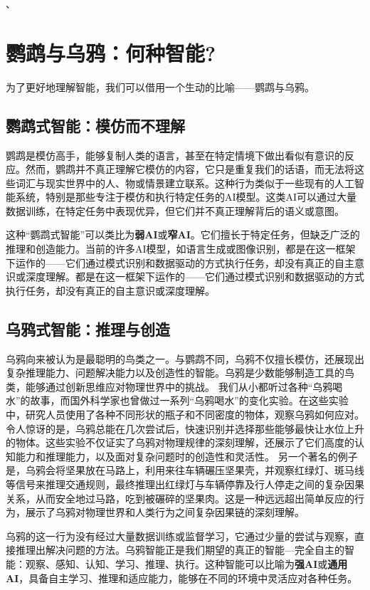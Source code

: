 、\section{鹦鹉与乌鸦：何种智能?}

为了更好地理解智能，我们可以借用一个生动的比喻——鹦鹉与乌鸦。

\subsection*{鹦鹉式智能：模仿而不理解}
鹦鹉是模仿高手，能够复制人类的语言，甚至在特定情境下做出看似有意识的反应。然而，鹦鹉并不真正理解它模仿的内容，它只是重复我们的话语，而无法将这些词汇与现实世界中的人、物或情景建立联系。这种行为类似于一些现有的人工智能系统，特别是那些专注于模仿和执行特定任务的AI模型。这类AI可以通过大量数据训练，在特定任务中表现优异，但它们并不真正理解背后的语义或意图。

这种“鹦鹉式智能”可以类比为{\bf 弱AI}或{\bf 窄AI}。它们擅长于特定任务，但缺乏广泛的推理和创造能力。当前的许多AI模型，如语言生成或图像识别，都是在这一框架下运作的——它们通过模式识别和数据驱动的方式执行任务，却没有真正的自主意识或深度理解。都是在这一框架下运作的——它们通过模式识别和数据驱动的方式执行任务，却没有真正的自主意识或深度理解。

\subsection*{乌鸦式智能：推理与创造}

乌鸦向来被认为是最聪明的鸟类之一。与鹦鹉不同，乌鸦不仅擅长模仿，还展现出复杂推理能力、问题解决能力以及创造性的智能。乌鸦是少数能够制造工具的鸟类，能够通过创新思维应对物理世界中的挑战。
我们从小都听过各种“乌鸦喝水”的故事，而国外科学家也曾做过一系列“乌鸦喝水”的变化实验。在这些实验中，研究人员使用了各种不同形状的瓶子和不同密度的物体，观察乌鸦如何应对。令人惊讶的是，乌鸦总能在几次尝试后，快速识别并选择那些能够最快让水位上升的物体。这些实验不仅证实了乌鸦对物理规律的深刻理解，还展示了它们高度的认知能力和推理能力，以及面对复杂问题时的创造性和灵活性。
另一个著名的例子是，乌鸦会将坚果放在马路上，利用来往车辆碾压坚果壳，并观察红绿灯、斑马线等信号来推理交通规则，最终推理出红绿灯与车辆停靠及行人停走之间的复杂因果关系，从而安全地过马路，吃到被碾碎的坚果肉。这是一种远远超出简单反应的行为，展示了乌鸦对物理世界和人类行为之间复杂因果链的深刻理解。

乌鸦的这一行为没有经过大量数据训练或监督学习，它通过少量的尝试与观察，直接推理出解决问题的方法。乌鸦智能正是我们期望的真正的智能---完全自主的智能：观察、感知、认知、学习、推理、执行。这种智能可以比喻为{\bf 强AI}或{\bf 通用AI}，具备自主学习、推理和适应能力，能够在不同的环境中灵活应对各种任务。

